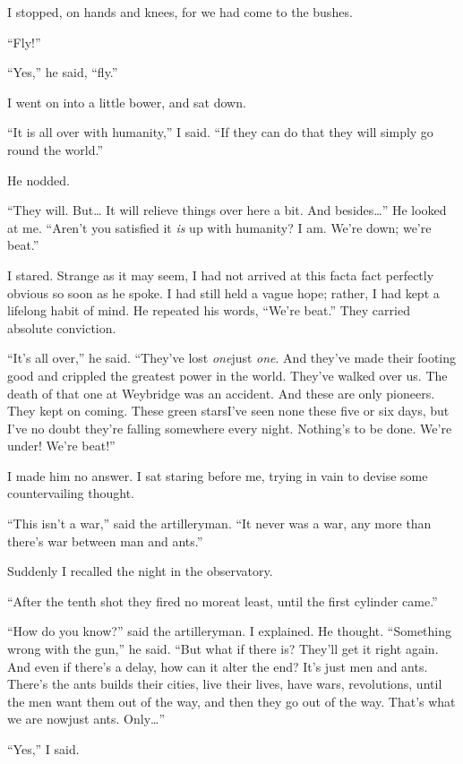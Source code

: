 I stopped, on hands and knees, for we had come to the bushes.

``Fly!''

``Yes,'' he said, ``fly.''

I went on into a little bower, and sat down.

``It is all over with humanity,'' I said. ``If they can do that they
will simply go round the world.''

He nodded.

``They will. But\ldots{} It will relieve things over here a bit. And
besides\ldots{}'' He looked at me. ``Aren't you satisfied it \emph{is} up
with humanity? I am. We're down; we're beat.''

I stared. Strange as it may seem, I had not arrived at this fact\dash{}a
fact perfectly obvious so soon as he spoke. I had still held a
vague hope; rather, I had kept a lifelong habit of mind. He
repeated his words, ``We're beat.'' They carried absolute
conviction.

``It's all over,'' he said. ``They've lost \emph{one}\dash{}just
\emph{one}. And they've made their footing good and crippled the
greatest power in the world. They've walked over us. The death of
that one at Weybridge was an accident. And these are only pioneers.
They kept on coming. These green stars\dash{}I've seen none these five
or six days, but I've no doubt they're falling somewhere every
night. Nothing's to be done. We're under! We're beat!''

I made him no answer. I sat staring before me, trying in vain to
devise some countervailing thought.

``This isn't a war,'' said the artilleryman. ``It never was a war, any
more than there's war between man and ants.''

Suddenly I recalled the night in the observatory.

``After the tenth shot they fired no more\dash{}at least, until the first
cylinder came.''

``How do you know?'' said the artilleryman. I explained. He thought.
``Something wrong with the gun,'' he said. ``But what if there is?
They'll get it right again. And even if there's a delay, how can it
alter the end? It's just men and ants. There's the ants builds
their cities, live their lives, have wars, revolutions, until the
men want them out of the way, and then they go out of the way.
That's what we are now\dash{}just ants. Only\ldots{}''

``Yes,'' I said.

